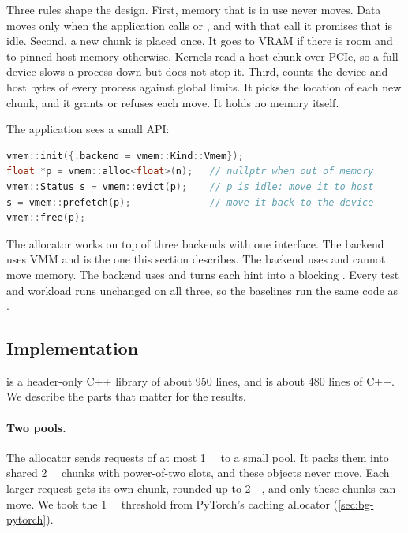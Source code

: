 Three rules shape the design. First, memory that is in use never moves. Data
moves only when the application calls  or ,
and with that call it promises that  is idle. Second, a new chunk is
placed once. It goes to VRAM if there is room and to pinned host memory
otherwise. Kernels read a host chunk over PCIe, so a full device slows a
process down but does not stop it. Third, \vmemd counts the device and host
bytes of every process against global limits. It picks the location of each
new chunk, and it grants or refuses each move. It holds no memory itself.

The application sees a small API:

\begin{lstlisting}[language=C++]
vmem::init({.backend = vmem::Kind::Vmem});
float *p = vmem::alloc<float>(n);   // nullptr when out of memory
vmem::Status s = vmem::evict(p);    // p is idle: move it to host
s = vmem::prefetch(p);              // move it back to the device
vmem::free(p);
\end{lstlisting}

The allocator works on top of three backends with one interface. The
 backend uses VMM and is the one this section describes. The
 backend uses  and cannot move memory. The
 backend uses  and turns each hint into a
blocking . Every test and workload runs unchanged
on all three, so the baselines run the same code as \libvmem.


\subsection{Implementation}
\label{sec:lv-impl}

\libvmem is a header-only C++ library of about 950 lines, and \vmemd is about
480 lines of C++. We describe the parts that matter for the results.

\paragraph{Two pools.} The allocator sends requests of at most
\SI{1}{\mebi\byte} to a small pool. It packs them into shared
\SI{2}{\mebi\byte} chunks with power-of-two slots, and these objects never
move. Each larger request gets its own chunk, rounded up to
\SI{2}{\mebi\byte}, and only these chunks can move. We took the
\SI{1}{\mebi\byte} threshold from PyTorch's caching allocator
(\cref{sec:bg-pytorch}).

